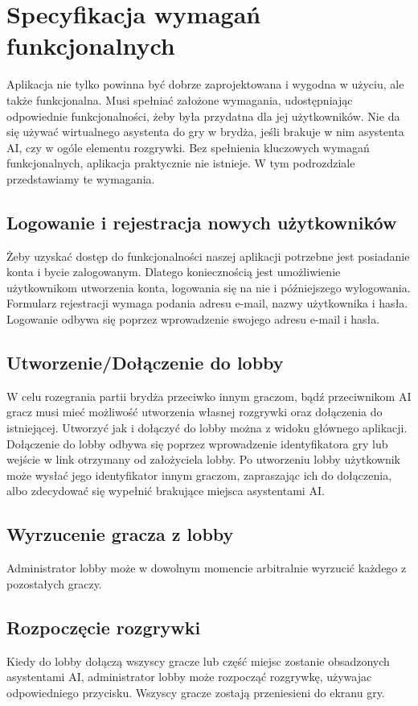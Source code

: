 


\section{Specyfikacja wymagań funkcjonalnych}
Aplikacja nie tylko powinna być dobrze zaprojektowana i wygodna w użyciu, ale także funkcjonalna. Musi spełniać założone wymagania, udostępniając odpowiednie funkcjonalności, żeby była przydatna dla jej użytkowników. Nie da się używać wirtualnego asystenta do gry w brydża, jeśli brakuje w nim asystenta AI, czy w ogóle elementu rozgrywki. Bez spełnienia kluczowych wymagań funkcjonalnych, aplikacja praktycznie nie istnieje. W tym podrozdziale przedstawiamy te wymagania.
\subsection{Logowanie i rejestracja nowych użytkowników}
Żeby uzyskać dostęp do funkcjonalności naszej aplikacji potrzebne jest posiadanie konta i bycie zalogowanym. Dlatego koniecznością jest umożliwienie użytkownikom utworzenia konta, logowania się na nie i późniejszego wylogowania. Formularz rejestracji wymaga podania adresu e-mail, nazwy użytkownika i hasła. Logowanie odbywa się poprzez wprowadzenie swojego adresu e-mail i hasła.
\subsection{Utworzenie/Dołączenie do lobby}
W celu rozegrania partii brydża przeciwko innym graczom, bądź przeciwnikom AI gracz musi mieć możliwość utworzenia własnej rozgrywki oraz dołączenia do istniejącej. Utworzyć jak i dołączyć do lobby można z widoku głównego aplikacji.  Dołączenie do lobby odbywa się poprzez wprowadzenie identyfikatora gry lub wejście w link otrzymany od założyciela lobby. Po utworzeniu lobby użytkownik może wysłać jego identyfikator innym graczom, zapraszając ich do dołączenia, albo zdecydować się wypełnić brakujące miejsca asystentami AI. 
\subsection{Wyrzucenie gracza z lobby}
Administrator lobby może w dowolnym momencie arbitralnie wyrzucić każdego z pozostałych graczy.
\subsection{Rozpoczęcie rozgrywki}
Kiedy do lobby dołączą wszyscy gracze lub część miejsc zostanie obsadzonych asystentami AI, administrator lobby może rozpocząć rozgrywkę, używajac odpowiedniego przycisku. Wszyscy gracze zostają przeniesieni do ekranu gry. 
